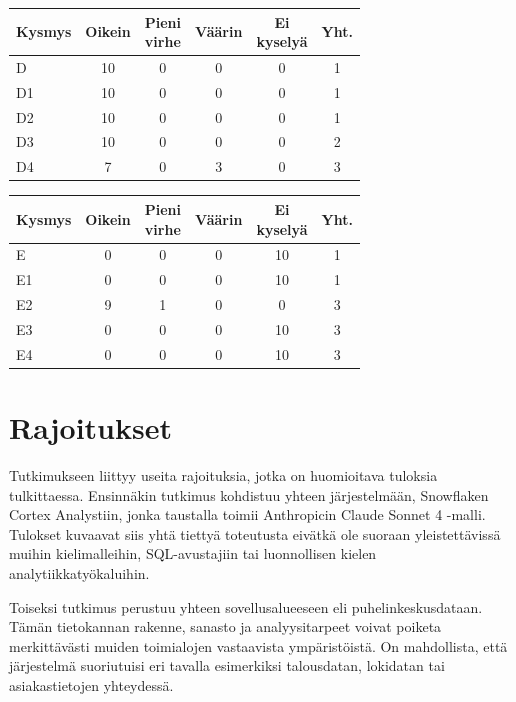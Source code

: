 \begin{table}[h]
  \vspace{0.3em}
  \centering
  \setlength{\tabcolsep}{4pt}
  \begin{tabular}{lccccc}
    \toprule
    Kysmys & Oikein & \makecell{Pieni\\virhe} & Väärin & \makecell{Ei\\kyselyä} & Yht. \\
    \midrule
    D  & 10 & 0 & 0 & 0 & 1 \\
    D1 & 10 & 0 & 0 & 0 & 1 \\
    D2 & 10 & 0 & 0 & 0 & 1 \\
    D3 & 10 & 0 & 0 & 0 & 2 \\
    D4 & 7  & 0 & 3 & 0 & 3 \\
    \bottomrule
  \end{tabular}

  \vspace{0.3em}
  \centering
  \setlength{\tabcolsep}{4pt}
  \begin{tabular}{lccccc}
    \toprule
    Kysmys & Oikein & \makecell{Pieni\\virhe} & Väärin & \makecell{Ei\\kyselyä} & Yht. \\
    \midrule
    E  & 0 & 0 & 0 & 10 & 1 \\
    E1 & 0 & 0 & 0 & 10 & 1 \\
    E2 & 9 & 1 & 0 & 0 & 3 \\
    E3 & 0 & 0 & 0 & 10 & 3 \\
    E4 & 0 & 0 & 0 & 10 & 3 \\
    \bottomrule
  \end{tabular}
\end{table}

\section{Rajoitukset}
Tutkimukseen liittyy useita rajoituksia, jotka on huomioitava tuloksia tulkittaessa. Ensinnäkin tutkimus kohdistuu yhteen järjestelmään, Snowflaken Cortex Analystiin, jonka taustalla toimii Anthropicin Claude Sonnet 4 -malli. Tulokset kuvaavat siis yhtä tiettyä toteutusta eivätkä ole suoraan yleistettävissä muihin kielimalleihin, SQL-avustajiin tai luonnollisen kielen analytiikkatyökaluihin.

Toiseksi tutkimus perustuu yhteen sovellusalueeseen eli puhelinkeskusdataan. Tämän tietokannan rakenne, sanasto ja analyysitarpeet voivat poiketa merkittävästi muiden toimialojen vastaavista ympäristöistä. On mahdollista, että järjestelmä suoriutuisi eri tavalla esimerkiksi talousdatan, lokidatan tai asiakastietojen yhteydessä.

